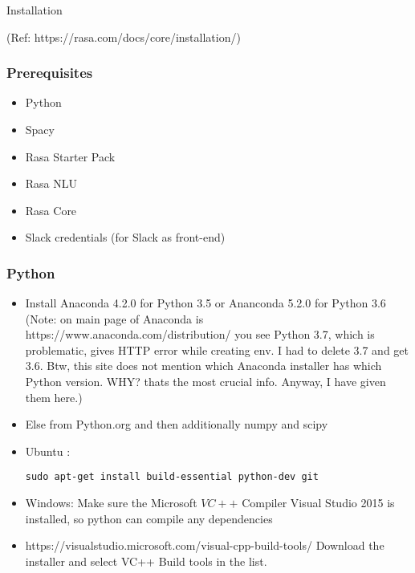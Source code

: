 \begin{frame}[fragile]\frametitle{}
\begin{center}
{\Large Installation}

{\tiny (Ref: https://rasa.com/docs/core/installation/)}
\end{center}
\end{frame}

 \begin{frame}[fragile]\frametitle{Prerequisites}
\begin{itemize}
\item Python
\item Spacy
\item Rasa Starter Pack
\item Rasa NLU
\item Rasa Core
\item Slack credentials (for Slack as front-end)
\end{itemize}
\end{frame}


 \begin{frame}[fragile]\frametitle{Python}
\begin{itemize}
\item Install Anaconda 4.2.0 for Python 3.5 or Ananconda 5.2.0 for Python 3.6 (Note: on main page of Anaconda is https://www.anaconda.com/distribution/ you see Python 3.7, which is problematic, gives HTTP error while creating env. I had to delete 3.7 and get 3.6. Btw, this site does not mention which Anaconda installer has which Python version. WHY? thats the most crucial info. Anyway, I have given them here.)
\item Else from Python.org and then additionally numpy and scipy
\item Ubuntu : 
\begin{lstlisting}
sudo apt-get install build-essential python-dev git
\end{lstlisting}
\item Windows: Make sure the Microsoft $VC++$ Compiler Visual Studio 2015 is installed, so python can compile any dependencies
\item https://visualstudio.microsoft.com/visual-cpp-build-tools/ Download the installer and select VC++ Build tools in the list.
\end{itemize}
\end{frame}

